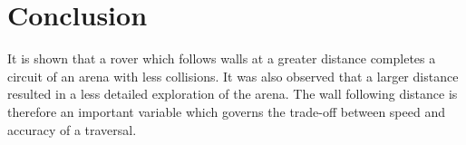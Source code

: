 \documentclass[a4paper,12pt,twocolumn]{article}
\begin{document}
\section{Conclusion}

It is shown that a rover which follows walls at a greater distance completes a circuit of an arena with less collisions. It was also observed that a larger distance resulted in a less detailed exploration of the arena. The wall following distance is therefore an important variable which governs the trade-off between speed and accuracy of a traversal.


\end{document}

